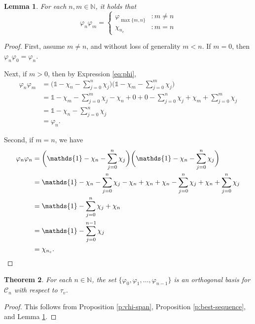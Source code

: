 \documentclass[]{amsart}
\newcommand{\ninn}{n \in \N}
\newcommand{\vhi}{{\varphi}}
\newcommand{\N}{{\mathds{N}}}
\newcommand{\cc}{{\mathcal{C}}}
\theoremstyle{plain}
\newtheorem{theorem}{Theorem}[section]
\newtheorem{lemma}[theorem]{Lemma}
\theoremstyle{definition}
\theoremstyle{remark}
\numberwithin{equation}{section}
\begin{document}
    
    \begin{lemma}\label{l:ortholemma}
    For each $n,m \in \N$, it holds that
    \[
    \vhi_n\vhi_m=\begin{cases}
            \vhi_{\max\{m,n\}} &  : m \neq n\\
            \chi_{n_c} &  :  m=n
    \end{cases}
    \]
    \end{lemma}
    \begin{proof}
    First, assume $m\neq n$, and without loss of generality $m<n$. If $m=0$, then $\vhi_n \vhi_0=\vhi_n$. 
    
    Next, if $m>0$, then by Expression \eqref{eq:phi},
    \begin{align*} 
        \vhi_n \vhi_m &= \bigg(\mathds{1} - \chi_n - \sum_{j=0}^{n}\chi_j\bigg)\bigg(\mathds{1} - \chi_m -                   \sum_{j=0}^{m}\chi_j\bigg)\\
                     &=  \mathds{1} - \chi_m - \sum_{j=0}^{m}\chi_j-\chi_n +0+0-\sum_{j=0}^n \chi_j +\chi_m+\sum_{j=0}^m\chi_j\\
                     &= \mathds{1} -\chi_n-\sum_{j=0}^n \chi_j\\
                     &=\vhi_n. 
    \end{align*}
    
    Second, if $m=n$, we have 
        \begin{align*} 
        \vhi_n \vhi_n &= \bigg(\mathds{1} - \chi_n - \sum_{j=0}^{n}\chi_j\bigg)\bigg(\mathds{1} - \chi_n -                   \sum_{j=0}^{n}\chi_j\bigg)\\
                     &=  \mathds{1} - \chi_n - \sum_{j=0}^{n}\chi_j-\chi_n +\chi_n+\chi_n-\sum_{j=0}^n \chi_j +\chi_n+\sum_{j=0}^n\chi_j\\
                     &=  \mathds{1}  - \sum_{j=0}^{n}\chi_j +\chi_n\\
                     &=\mathds{1}  - \sum_{j=0}^{n-1}\chi_j \\
                     & = \chi_{n_c}.\qedhere
    \end{align*}
    \end{proof}
 
\begin{theorem}\label{t:ortho-basis} 
   For each $\ninn$, the set $\{\vhi_0, \vhi_1, \ldots, \vhi_{n-1}\}$ is an orthogonal basis for $\cc_n$ with respect to $\tau_v$.
\end{theorem}
\begin{proof}
   This follows from Proposition \ref{p:vhi-span}, Proposition \ref{p:best-sequence}, and Lemma \ref{l:ortholemma}.
\end{proof}      
\end{document}
